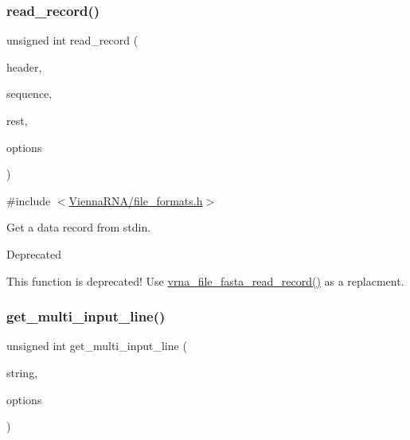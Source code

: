\subsubsection{\texorpdfstring{read\+\_\+record()}{read\_record()}}
{\footnotesize\ttfamily unsigned int read\+\_\+record (\begin{DoxyParamCaption}\item[{char $\ast$$\ast$}]{header,  }\item[{char $\ast$$\ast$}]{sequence,  }\item[{char $\ast$$\ast$$\ast$}]{rest,  }\item[{unsigned int}]{options }\end{DoxyParamCaption})}



{\ttfamily \#include $<$\mbox{\hyperlink{file__formats_8h}{Vienna\+R\+N\+A/file\+\_\+formats.\+h}}$>$}



Get a data record from stdin. 

\begin{DoxyRefDesc}{Deprecated}
\item[\mbox{\hyperlink{deprecated__deprecated000068}{Deprecated}}]This function is deprecated! Use \mbox{\hyperlink{group__file__utils_ga8cfb7e271efc9e1f34640acb85475639}{vrna\+\_\+file\+\_\+fasta\+\_\+read\+\_\+record()}} as a replacment.\end{DoxyRefDesc}
\mbox{\label{group__file__utils_ga61b9a7a4716c98a315ee9da411515f9c}} 
\subsubsection{\texorpdfstring{get\+\_\+multi\+\_\+input\+\_\+line()}{get\_multi\_input\_line()}}
{\footnotesize\ttfamily unsigned int get\+\_\+multi\+\_\+input\+\_\+line (\begin{DoxyParamCaption}\item[{char $\ast$$\ast$}]{string,  }\item[{unsigned int}]{options }\end{DoxyParamCaption})}



